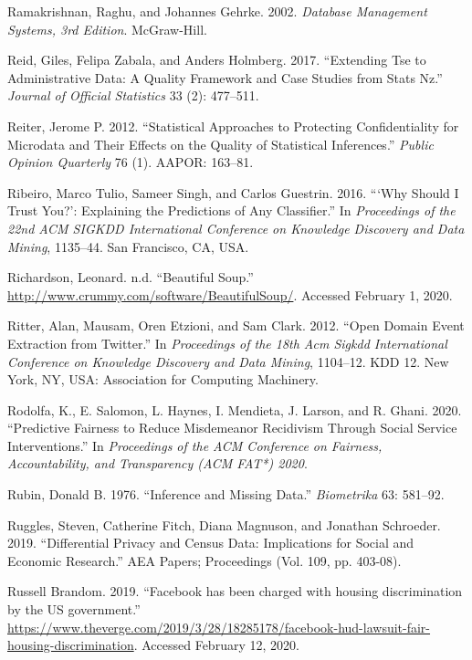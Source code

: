 \documentclass[]{krantz}
\begin{document}
\hypertarget{ref-ramakrishnan2000database}{}
Ramakrishnan, Raghu, and Johannes Gehrke. 2002. \emph{Database
Management Systems, 3rd Edition}. McGraw-Hill.

\hypertarget{ref-Reid2017}{}
Reid, Giles, Felipa Zabala, and Anders Holmberg. 2017. ``Extending Tse
to Administrative Data: A Quality Framework and Case Studies from Stats
Nz.'' \emph{Journal of Official Statistics} 33 (2): 477--511.

\hypertarget{ref-reiter2012statistical}{}
Reiter, Jerome P. 2012. ``Statistical Approaches to Protecting
Confidentiality for Microdata and Their Effects on the Quality of
Statistical Inferences.'' \emph{Public Opinion Quarterly} 76 (1). AAPOR:
163--81.

\hypertarget{ref-ribeiro-16}{}
Ribeiro, Marco Tulio, Sameer Singh, and Carlos Guestrin. 2016. ```Why
Should I Trust You?': Explaining the Predictions of Any Classifier.'' In
\emph{Proceedings of the 22nd ACM SIGKDD International Conference on
Knowledge Discovery and Data Mining}, 1135--44. San Francisco, CA, USA.

\hypertarget{ref-bsoup}{}
Richardson, Leonard. n.d. ``Beautiful Soup.''
\url{http://www.crummy.com/software/BeautifulSoup/}. Accessed February
1, 2020.

\hypertarget{ref-Ritter2012}{}
Ritter, Alan, Mausam, Oren Etzioni, and Sam Clark. 2012. ``Open Domain
Event Extraction from Twitter.'' In \emph{Proceedings of the 18th Acm
Sigkdd International Conference on Knowledge Discovery and Data Mining},
1104--12. KDD 12. New York, NY, USA: Association for Computing
Machinery.

\hypertarget{ref-Rodolfa2020}{}
Rodolfa, K., E. Salomon, L. Haynes, I. Mendieta, J. Larson, and R.
Ghani. 2020. ``Predictive Fairness to Reduce Misdemeanor Recidivism
Through Social Service Interventions.'' In \emph{Proceedings of the ACM
Conference on Fairness, Accountability, and Transparency (ACM FAT*)
2020}.

\hypertarget{ref-rubin1976}{}
Rubin, Donald B. 1976. ``Inference and Missing Data.'' \emph{Biometrika}
63: 581--92.

\hypertarget{ref-ruggles2019}{}
Ruggles, Steven, Catherine Fitch, Diana Magnuson, and Jonathan
Schroeder. 2019. ``Differential Privacy and Census Data: Implications
for Social and Economic Research.'' AEA Papers; Proceedings (Vol. 109,
pp. 403-08).

\hypertarget{ref-brandom2019}{}
Russell Brandom. 2019. ``Facebook has been charged with housing
discrimination by the US government.''
\url{https://www.theverge.com/2019/3/28/18285178/facebook-hud-lawsuit-fair-housing-discrimination}.
Accessed February 12, 2020.
\end{document}
